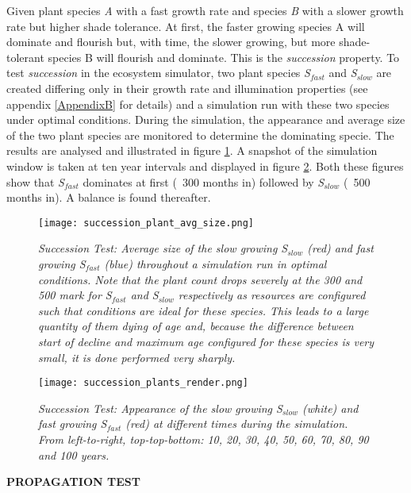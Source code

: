 Given plant species \textit{A} with a fast growth rate and species \textit{B} with a slower growth rate but higher shade tolerance. At first, the faster growing species A will dominate and flourish but, with time, the slower growing, but more shade-tolerant species B will flourish and dominate. This is the \textit{succession} property. To test \textit{succession} in the ecosystem simulator, two plant species \textit{S$_{fast}$} and \textit{S$_{slow}$} are created differing only in their growth rate and illumination properties (see appendix \ref{AppendixB} for details) and a simulation run with these two species under optimal conditions. During the simulation, the appearance and average size of the two plant species are monitored to determine the dominating specie. The results are analysed and illustrated in figure \ref{fig:succession_plants_avg_size}. A snapshot of the simulation window is taken at ten year intervals and displayed in figure \ref{fig:succession_plants_render}. Both these figures show that \textit{S$_{fast}$} dominates at first (~300 months in) followed by \textit{S$_{slow}$} (~500 months in). A balance is found thereafter.\\

\begin{figure}
\center
	\texttt{[image: succession\_plant\_avg\_size.png]}
	\caption{ \textit{Succession Test: Average size of the slow growing S$_{slow}$ (red) and fast growing S$_{fast}$ (blue) throughout a simulation run in optimal conditions. Note that the plant count drops severely at the 300 and 500 mark for S$_{fast}$ and S$_{slow}$ respectively as resources are configured such that conditions are ideal for these species. This leads to a large quantity of them dying of age and, because the difference between start of decline and maximum age configured for these species is very small, it is done performed very sharply.}}
	\label{fig:succession_plants_avg_size}
\end{figure}

\begin{figure}
\center
	\texttt{[image: succession\_plants\_render.png]}
	\caption{ \textit{Succession Test: Appearance of the slow growing S$_{slow}$ (white) and fast growing S$_{fast}$ (red) at different times during the simulation. From left-to-right, top-top-bottom: 10, 20, 30, 40, 50, 60, 70, 80, 90 and 100 years.}}
	\label{fig:succession_plants_render}
\end{figure}

\textbf{PROPAGATION TEST}\\

